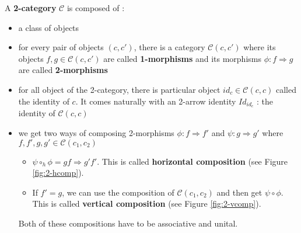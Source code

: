 \begin{defn}[2-category]
    A \textbf{2-category}\cite{kelly1974review} $\mathcal{C}$ is composed of :
    \begin{itemize}
        \item a class of objects
        \item for every pair of objects $(c,c')$, there is a category $\mathcal{C}(c,c')$ where its objects $f,g\in \mathcal{C}(c,c')$ are called \textbf{1-morphisms} and its morphisms $\phi : f\Rightarrow g$ are called \textbf{2-morphisms}
        \item for all object of the 2-category, there is particular object $id_c\in \mathcal{C}(c,c)$ called the identity of $c$. It comes naturally with an 2-arrow identity $Id_{id_c}$ : the identity of  $\mathcal{C}(c,c)$
        \item we get two ways of composing 2-morphisms $\phi : f\Rightarrow f'$
              and $\psi : g\Rightarrow g'$ where $f,f',g,g' \in \mathcal{C}(c_1,c_2)$
              \begin{itemize}
                  \item $\psi\circ_h\phi = gf\Rightarrow g'f'$. This is called \textbf{horizontal composition}  (see Figure \ref{fig:2-hcomp}).
                  \item If $f' = g$, we can use the composition of $\mathcal{C}(c_1,c_2)$ and then get $\psi\circ\phi$. This is called \textbf{vertical composition} (see Figure \ref{fig:2-vcomp}).
              \end{itemize}
              Both of these compositions have to be associative and unital.


\end{itemize}
\end{defn}

